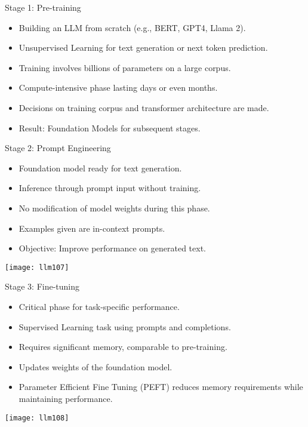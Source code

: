 \begin{frame}[fragile]{Stage 1: Pre-training}
    \begin{itemize}
        \item Building an LLM from scratch (e.g., BERT, GPT4, Llama 2).
        \item Unsupervised Learning for text generation or next token prediction.
        \item Training involves billions of parameters on a large corpus.
        \item Compute-intensive phase lasting days or even months.
        \item Decisions on training corpus and transformer architecture are made.
        \item Result: Foundation Models for subsequent stages.
    \end{itemize}
\end{frame}

\begin{frame}[fragile]{Stage 2: Prompt Engineering}
    \begin{itemize}
        \item Foundation model ready for text generation.
        \item Inference through prompt input without training.
        \item No modification of model weights during this phase.
        \item Examples given are in-context prompts.
        \item Objective: Improve performance on generated text.
    \end{itemize}
	
		\begin{center}
		\texttt{[image: llm107]}
		\end{center}	
\end{frame}

\begin{frame}[fragile]{Stage 3: Fine-tuning}
    \begin{itemize}
        \item Critical phase for task-specific performance.
        \item Supervised Learning task using prompts and completions.
        \item Requires significant memory, comparable to pre-training.
        \item Updates weights of the foundation model.
        \item Parameter Efficient Fine Tuning (PEFT) reduces memory requirements while maintaining performance.
    \end{itemize}
	
		\begin{center}
		\texttt{[image: llm108]}
		\end{center}	
\end{frame}

